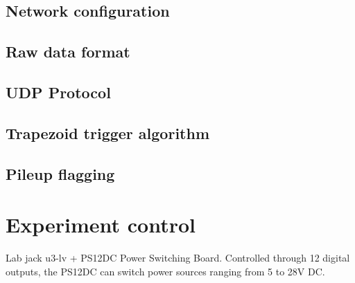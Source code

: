 \cite{sis3316_manual, sis3316_udp_addendum}


\subsection{Network configuration}



\subsection{Raw data format}



\subsection{UDP Protocol}



\subsection{Trapezoid trigger algorithm}



\subsection{Pileup flagging}



\section{Experiment control}


Lab jack u3-lv + PS12DC Power Switching Board. Controlled through 12 digital outputs, the PS12DC can switch power sources ranging from 5 to 28V DC. 

